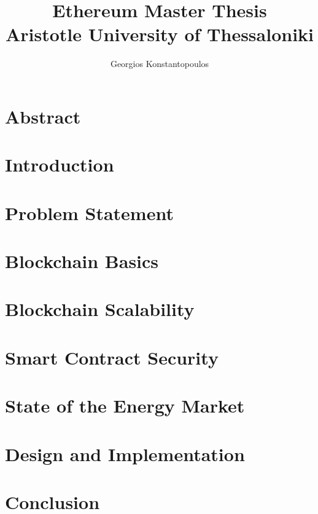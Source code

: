 \documentclass[12pt,twoside]{report}
\title{
	{Ethereum Master Thesis}\\
	{\large Aristotle University of Thessaloniki}\\
}
\author{Georgios Konstantopoulos}
\date{}
\begin{document}
\maketitle
\tableofcontents

\chapter{Abstract}


\chapter{Introduction}


\chapter{Problem Statement}


\chapter{Blockchain Basics}


\chapter{Blockchain Scalability}


\chapter{Smart Contract Security}


\chapter{State of the Energy Market}


\chapter{Design and Implementation}


\chapter{Conclusion}

\end{document}
